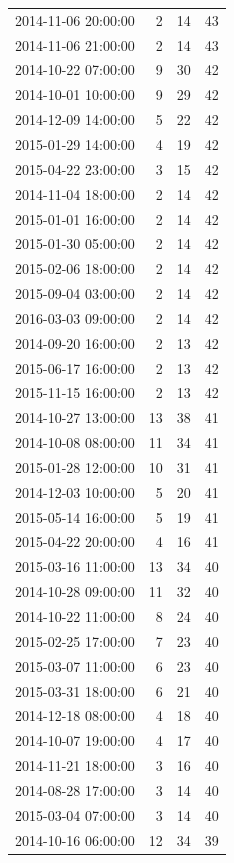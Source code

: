 \begin{tabular}{lrrr}
2014-11-06 20:00:00 & 2 & 14 & 43 \\
2014-11-06 21:00:00 & 2 & 14 & 43 \\
2014-10-22 07:00:00 & 9 & 30 & 42 \\
2014-10-01 10:00:00 & 9 & 29 & 42 \\
2014-12-09 14:00:00 & 5 & 22 & 42 \\
2015-01-29 14:00:00 & 4 & 19 & 42 \\
2015-04-22 23:00:00 & 3 & 15 & 42 \\
2014-11-04 18:00:00 & 2 & 14 & 42 \\
2015-01-01 16:00:00 & 2 & 14 & 42 \\
2015-01-30 05:00:00 & 2 & 14 & 42 \\
2015-02-06 18:00:00 & 2 & 14 & 42 \\
2015-09-04 03:00:00 & 2 & 14 & 42 \\
2016-03-03 09:00:00 & 2 & 14 & 42 \\
2014-09-20 16:00:00 & 2 & 13 & 42 \\
2015-06-17 16:00:00 & 2 & 13 & 42 \\
2015-11-15 16:00:00 & 2 & 13 & 42 \\
2014-10-27 13:00:00 & 13 & 38 & 41 \\
2014-10-08 08:00:00 & 11 & 34 & 41 \\
2015-01-28 12:00:00 & 10 & 31 & 41 \\
2014-12-03 10:00:00 & 5 & 20 & 41 \\
2015-05-14 16:00:00 & 5 & 19 & 41 \\
2015-04-22 20:00:00 & 4 & 16 & 41 \\
2015-03-16 11:00:00 & 13 & 34 & 40 \\
2014-10-28 09:00:00 & 11 & 32 & 40 \\
2014-10-22 11:00:00 & 8 & 24 & 40 \\
2015-02-25 17:00:00 & 7 & 23 & 40 \\
2015-03-07 11:00:00 & 6 & 23 & 40 \\
2015-03-31 18:00:00 & 6 & 21 & 40 \\
2014-12-18 08:00:00 & 4 & 18 & 40 \\
2014-10-07 19:00:00 & 4 & 17 & 40 \\
2014-11-21 18:00:00 & 3 & 16 & 40 \\
2014-08-28 17:00:00 & 3 & 14 & 40 \\
2015-03-04 07:00:00 & 3 & 14 & 40 \\
2014-10-16 06:00:00 & 12 & 34 & 39 \\

\end{tabular}
